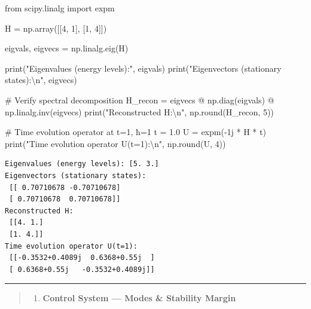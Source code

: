 \documentclass[
  letterpaper,
  DIV=11,
  numbers=noendperiod]{scrreprt}
\newenvironment{Shaded}{\begin{snugshade}}{\end{snugshade}}
\newcommand{\BuiltInTok}[1]{\textcolor[rgb]{0.00,0.23,0.31}{#1}}
\newcommand{\CharTok}[1]{\textcolor[rgb]{0.13,0.47,0.30}{#1}}
\newcommand{\CommentTok}[1]{\textcolor[rgb]{0.37,0.37,0.37}{#1}}
\newcommand{\DecValTok}[1]{\textcolor[rgb]{0.68,0.00,0.00}{#1}}
\newcommand{\FloatTok}[1]{\textcolor[rgb]{0.68,0.00,0.00}{#1}}
\newcommand{\ImportTok}[1]{\textcolor[rgb]{0.00,0.46,0.62}{#1}}
\newcommand{\NormalTok}[1]{\textcolor[rgb]{0.00,0.23,0.31}{#1}}
\newcommand{\OperatorTok}[1]{\textcolor[rgb]{0.37,0.37,0.37}{#1}}
\newcommand{\OtherTok}[1]{\textcolor[rgb]{0.00,0.23,0.31}{#1}}
\newcommand{\StringTok}[1]{\textcolor[rgb]{0.13,0.47,0.30}{#1}}
\providecommand{\tightlist}{%
  \setlength{\itemsep}{0pt}\setlength{\parskip}{0pt}}
\begin{document}
\begin{Shaded}
\begin{Highlighting}[]
\ImportTok{from}\NormalTok{ scipy.linalg }\ImportTok{import}\NormalTok{ expm}

\NormalTok{H }\OperatorTok{=}\NormalTok{ np.array([[}\DecValTok{4}\NormalTok{, }\DecValTok{1}\NormalTok{],}
\NormalTok{              [}\DecValTok{1}\NormalTok{, }\DecValTok{4}\NormalTok{]])}

\NormalTok{eigvals, eigvecs }\OperatorTok{=}\NormalTok{ np.linalg.eig(H)}

\BuiltInTok{print}\NormalTok{(}\StringTok{"Eigenvalues (energy levels):"}\NormalTok{, eigvals)}
\BuiltInTok{print}\NormalTok{(}\StringTok{"Eigenvectors (stationary states):}\CharTok{\textbackslash{}n}\StringTok{"}\NormalTok{, eigvecs)}

\CommentTok{\# Verify spectral decomposition}
\NormalTok{H\_recon }\OperatorTok{=}\NormalTok{ eigvecs }\OperatorTok{@}\NormalTok{ np.diag(eigvals) }\OperatorTok{@}\NormalTok{ np.linalg.inv(eigvecs)}
\BuiltInTok{print}\NormalTok{(}\StringTok{"Reconstructed H:}\CharTok{\textbackslash{}n}\StringTok{"}\NormalTok{, np.}\BuiltInTok{round}\NormalTok{(H\_recon, }\DecValTok{5}\NormalTok{))}

\CommentTok{\# Time evolution operator at t=1, ħ=1}
\NormalTok{t }\OperatorTok{=} \FloatTok{1.0}
\NormalTok{U }\OperatorTok{=}\NormalTok{ expm(}\OperatorTok{{-}}\OtherTok{1j} \OperatorTok{*}\NormalTok{ H }\OperatorTok{*}\NormalTok{ t)}
\BuiltInTok{print}\NormalTok{(}\StringTok{"Time evolution operator U(t=1):}\CharTok{\textbackslash{}n}\StringTok{"}\NormalTok{, np.}\BuiltInTok{round}\NormalTok{(U, }\DecValTok{4}\NormalTok{))}
\end{Highlighting}
\end{Shaded}

\begin{verbatim}
Eigenvalues (energy levels): [5. 3.]
Eigenvectors (stationary states):
 [[ 0.70710678 -0.70710678]
 [ 0.70710678  0.70710678]]
Reconstructed H:
 [[4. 1.]
 [1. 4.]]
Time evolution operator U(t=1):
 [[-0.3532+0.4089j  0.6368+0.55j  ]
 [ 0.6368+0.55j   -0.3532+0.4089j]]
\end{verbatim}

\begin{center}\rule{0.5\linewidth}{0.5pt}\end{center}

\begin{quote}
\begin{enumerate}
\def\labelenumi{\arabic{enumi}.}
\setcounter{enumi}{4}
\tightlist
\item
  \textbf{Control System --- Modes \& Stability Margin}
\end{enumerate}
\end{quote}
\end{document}
